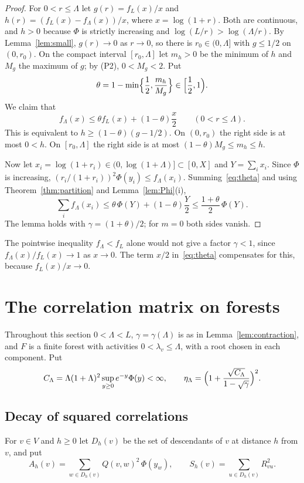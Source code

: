 \documentclass{amsart}
\numberwithin{equation}{section}
\numberwithin{table}{section}
\theoremstyle{definition}
\theoremstyle{remark}
\begin{document}
\begin{proof}
For $0<r\le\Lambda$ let $g(r)=f_L(x)/x$ and $h(r)=(f_L(x)-f_\Lambda(x))/x$, where $x=\log(1+r)$. Both are continuous, and $h>0$ because $\Phi$ is strictly increasing and $\log(L/r)>\log(\Lambda/r)$. By Lemma~\ref{lem:small}, $g(r)\to0$ as $r\to0$, so there is $r_0\in(0,\Lambda]$ with $g\le1/2$ on $(0,r_0)$. On the compact interval $[r_0,\Lambda]$ let $m_h>0$ be the minimum of $h$ and $M_g$ the maximum of $g$; by (P2), $0<M_g<2$. Put
\[
\theta=1-\min\Bigl\{\frac12,\frac{m_h}{M_g}\Bigr\}\in\Bigl[\frac12,1\Bigr).
\]
We claim that
\begin{equation}\label{eq:theta}
f_\Lambda(x)\le\theta f_L(x)+(1-\theta)\frac x2\qquad(0<r\le\Lambda).
\end{equation}
This is equivalent to $h\ge(1-\theta)(g-1/2)$. On $(0,r_0)$ the right side is at most $0<h$. On $[r_0,\Lambda]$ the right side is at most $(1-\theta)M_g\le m_h\le h$.

Now let $x_i=\log(1+r_i)\in(0,\log(1+\Lambda)]\subset[0,X]$ and $Y=\sum_ix_i$. Since $\Phi$ is increasing, $(r_i/(1+r_i))^2\Phi(y_i)\le f_\Lambda(x_i)$. Summing~\eqref{eq:theta} and using Theorem~\ref{thm:partition} and Lemma~\ref{lem:Phi}(i),
\[
\sum_if_\Lambda(x_i)\le\theta\,\Phi(Y)+(1-\theta)\frac Y2\le\frac{1+\theta}{2}\,\Phi(Y).
\]
The lemma holds with $\gamma=(1+\theta)/2$; for $m=0$ both sides vanish.
\end{proof}

The pointwise inequality $f_\Lambda<f_L$ alone would not give a factor $\gamma<1$, since $f_\Lambda(x)/f_L(x)\to1$ as $x\to0$. The term $x/2$ in~\eqref{eq:theta} compensates for this, because $f_L(x)/x\to0$.

\section{The correlation matrix on forests}\label{sec:forests}

Throughout this section $0<\Lambda<L$, $\gamma=\gamma(\Lambda)$ is as in Lemma~\ref{lem:contraction}, and $F$ is a finite forest with activities $0<\lambda_v\le\Lambda$, with a root chosen in each component. Put
\begin{equation}\label{eq:CLambda}
C_\Lambda=\Lambda(1+\Lambda)^2\sup_{y\ge0}e^{-y}\Phi(y)<\infty,\qquad \eta_\Lambda=\Bigl(1+\frac{\sqrt{C_\Lambda}}{1-\sqrt\gamma}\Bigr)^2 .
\end{equation}

\subsection{Decay of squared correlations}
For $v\in V$ and $h\ge0$ let $D_h(v)$ be the set of descendants of $v$ at distance $h$ from $v$, and put
\[
A_h(v)=\sum_{w\in D_h(v)}Q(v,w)^2\,\Phi(y_w),\qquad S_h(v)=\sum_{u\in D_h(v)}R_{vu}^2 .
\]
\end{document}
